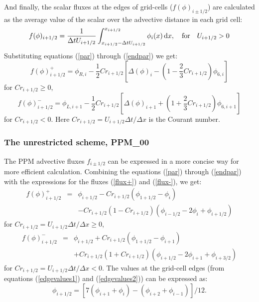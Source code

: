  And finally, the scalar fluxes at the edges of grid-cells
  ($f(\phi)_{i\pm1/2}$) are calculated as the average value of the scalar
  over the advective distance in each grid cell:  
  \begin{equation}
    f(\phi)_{i+1/2} = \frac{1}{\Delta t U_{i+1/2}}
    \int_{x_{i+1/2}-\Delta tU_{i+1/2}}^{x_{i+1/2}} \phi_{i}(x) \,\mathrm{d} x,
    \quad \mathrm{for} \quad U_{i+1/2} > 0
  \end{equation}
  Substituting equations (\ref{par}) through (\ref{endpar}) we get:
  \begin{equation}
    \label{flux+}
    f(\phi)_{i+1/2}^{+} = \phi_{R,i} -
     \frac{1}{2} Cr_{i+1/2} \left[\Delta(\phi)_{i} - 
     \left(1- \frac{2}{3} Cr_{i+1/2} \right) \phi_{6,i} \right]
  \end{equation}
  for $Cr_{i+1/2} \geq 0$,
  \begin{equation}
    \label{flux-}
    f(\phi)_{i+1/2}^{-} = \phi_{L,i+1} -
     \frac{1}{2} Cr_{i+1/2} \left[ \Delta(\phi)_{i+1} + 
     \left(1 + \frac{2}{3} Cr_{i+1/2} \right) \phi_{6,i+1} \right]
  \end{equation}
  for $Cr_{i+1/2} < 0$. Here $Cr_{i+1/2} = U_{i+1/2}\Delta t/\Delta x$
  is the Courant number. 

  \subsubsection{The unrestricted scheme, PPM\_00}

  The PPM advective fluxes $f_{i\pm1/2}$ can be expressed in a more
  concise way for more efficient calculation. Combining the equations
  (\ref{par}) through (\ref{endpar}) with the expressions for the fluxes
  (\ref{flux+}) and (\ref{flux-}), we get:
  \begin{eqnarray}
    \label{sflux+}
    f(\phi)_{i+1/2}^{+} &=& \phi_{i+1/2} - Cr_{i+1/2}(\phi_{1+1/2} -
    \phi_{i}) \\ \nonumber
    & & - Cr_{i+1/2}(1-Cr_{i+1/2})(\phi_{i-1/2} - 2\phi_{i} +
    \phi_{i+1/2})    
  \end{eqnarray}
  for $Cr_{i+1/2} = U_{i+1/2}\Delta t/\Delta x \geq 0$,
  \begin{eqnarray}
    \label{sflux-}
    f(\phi)_{i+1/2}^{-} &=& \phi_{i+1/2} + Cr_{i+1/2}(\phi_{1+1/2} -
    \phi_{i+1}) \\ \nonumber
    & & + Cr_{i+1/2}(1+Cr_{i+1/2})(\phi_{i+1/2} - 2\phi_{i+1} +
     \phi_{i+3/2}) 
  \end{eqnarray}
  for $Cr_{i+1/2} = U_{i+1/2}\Delta t/\Delta x < 0$. The values at the
  grid-cell edges (from equations (\ref{edgevalues1}) and
  (\ref{edgevalues2})) can be expressed as:
  \begin{equation}
    \label{sedgevalues}
    \phi_{i+1/2} = \left [7(\phi_{i+1} + \phi_{i}) - (\phi_{i+2} +
     \phi_{i-1}) \right ]/12.
  \end{equation}
    

